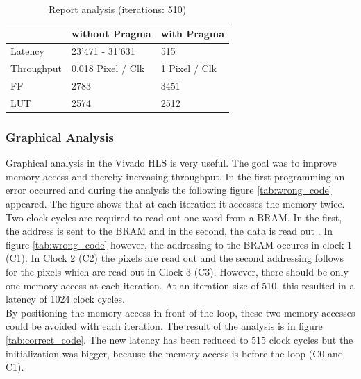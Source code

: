 \begin{table}[h!]
    \centering
    \begin{tabular}{ l l l }
    	\toprule
         & {without Pragma} & {with Pragma} \\ 
        \midrule
        Latency & 23'471 - 31'631 & 515 \\
        Throughput & 0.018 Pixel / Clk & 1 Pixel / Clk \\ 
        FF & 2783 & 3451 \\ 
        LUT & 2574 & 2512 \\ 
        \bottomrule
    \end{tabular}
    \caption{Report analysis (iterations: 510)}
    \label{tab:analysis}
\end{table}

\clearpage
\subsubsection*{Graphical Analysis}
Graphical analysis in the Vivado HLS is very useful. The goal was to improve memory access and thereby increasing throughput. In the first programming an error occurred and during the analysis the following figure \ref{tab:wrong_code} appeared. The figure shows that at each iteration it accesses the memory twice. Two clock cycles are required to read out one word from a BRAM. In the first, the address is sent to the BRAM and in the second, the data is read out \cite{bram}. In figure \ref{tab:wrong_code} however, the addressing to the BRAM occures in clock 1 (C1). In Clock 2 (C2) the pixels are read out and the second addressing follows for the pixels which are read out in Clock 3 (C3). However, there should be only one memory access at each iteration. At an iteration size of 510, this resulted in a latency of 1024 clock cycles. \\

By positioning the memory access in front of the loop, these two memory accesses could be avoided with each iteration. The result of the analysis is in figure \ref{tab:correct_code}. The new latency has been reduced to 515 clock cycles but the initialization was bigger, because the memory access is before the loop (C0 and C1).


